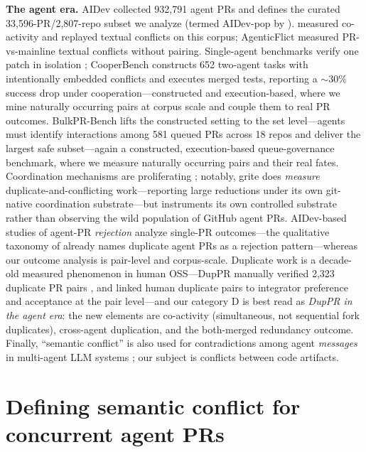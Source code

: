 \documentclass{article}
\begin{document}
\textbf{The agent era.} AIDev \citep{li2026aidev,li2025rise} collected 932{,}791 agent PRs and defines the curated 33{,}596-PR/2{,}807-repo subset we analyze (termed AIDev-pop by \citet{xu2026agentprs}). %
\citet{xu2026agentprs} measured co-activity and replayed textual conflicts on this corpus; AgenticFlict \citep{agenticflict} measured PR-vs-mainline textual conflicts without pairing. Single-agent benchmarks verify one patch in isolation \citep{swebench,swegym}; CooperBench \citep{cooperbench} constructs 652 two-agent tasks with intentionally embedded conflicts and executes merged tests, reporting a ${\sim}30\%$ success drop under cooperation---constructed and execution-based, where we mine naturally occurring pairs at corpus scale and couple them to real PR outcomes. %
BulkPR-Bench \citep{bulkprbench} lifts the constructed setting to the set level---agents must identify interactions among 581 queued PRs across 18 repos and deliver the largest safe subset---again a constructed, execution-based queue-governance benchmark, where we measure naturally occurring pairs and their real fates. %
Coordination mechanisms are proliferating \citep{caid,coagent,grite,spoq}; notably, grite \citep{grite} does \emph{measure} duplicate-and-conflicting work---reporting large reductions under its own git-native coordination substrate---but instruments its own controlled substrate rather than observing the wild population of GitHub agent PRs. AIDev-based studies of agent-PR \emph{rejection} \citep{rejection2026,ehsani2026fail} analyze single-PR outcomes---the qualitative taxonomy of \citet{ehsani2026fail} already names duplicate agent PRs as a rejection pattern---whereas our outcome analysis is pair-level and corpus-scale. Duplicate work is a decade-old measured phenomenon in human OSS---DupPR manually verified 2{,}323 duplicate PR pairs \citep{duppr}, and \citet{li2022duplicates} linked human duplicate pairs to integrator preference and acceptance at the pair level---and our category D is best read as \emph{DupPR in the agent era}: the new elements are co-activity (simultaneous, not sequential fork duplicates), cross-agent duplication, and the both-merged redundancy outcome. Finally, ``semantic conflict'' is also used for contradictions among agent \emph{messages} in multi-agent LLM systems \citep{semcons2026}; our subject is conflicts between code artifacts.

\section{Defining semantic conflict for concurrent agent PRs}
\label{sec:taxonomy}
\end{document}
